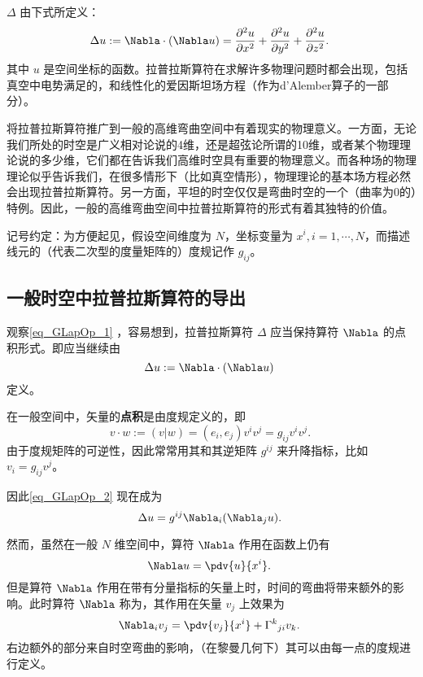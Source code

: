 
 $\Delta$ 由下式所定义：
\begin{equation}\label{eq_GLapOp_1}
\Delta u:=\Nabla\cdot (\Nabla u)=\frac{\partial^{2}{u}}{\partial{x}^{2}} + \frac{\partial^{2}{u}}{\partial{y}^{2}} + \frac{\partial^{2}{u}}{\partial{z}^{2}}.~
\end{equation}
其中 $u$ 是空间坐标的函数。拉普拉斯算符在求解许多物理问题时都会出现，包括真空中电势满足的，和线性化的爱因斯坦场方程（作为d'Alember算子的一部分）。

将拉普拉斯算符推广到一般的高维弯曲空间中有着现实的物理意义。一方面，无论我们所处的时空是广义相对论说的4维，还是超弦论所谓的10维，或者某个物理理论说的多少维，它们都在告诉我们高维时空具有重要的物理意义。而各种场的物理理论似乎告诉我们，在很多情形下（比如真空情形），物理理论的基本场方程必然会出现拉普拉斯算符。另一方面，平坦的时空仅仅是弯曲时空的一个（曲率为0的）特例。因此，一般的高维弯曲空间中拉普拉斯算符的形式有着其独特的价值。

记号约定：为方便起见，假设空间维度为 $N$，坐标变量为 $x^i,i=1,\cdots,N$，而描述线元的（代表二次型的度量矩阵的）度规记作 $g_{ij}$。

\subsection{一般时空中拉普拉斯算符的导出}
观察\autoref{eq_GLapOp_1} ，容易想到，拉普拉斯算符 $\Delta$ 应当保持算符 $\Nabla$ 的点积形式。即应当继续由
\begin{equation}\label{eq_GLapOp_2}
\Delta u:=\Nabla\cdot (\Nabla u)~
\end{equation}
定义。

在一般空间中，矢量的\textbf{点积}是由度规定义的，即
\begin{equation}
v\cdot w:=(v|w)=(e_i,e_j)v^iv^j=g_{ij}v^iv^j.~
\end{equation}
由于度规矩阵的可逆性，因此常常用其和其逆矩阵 $g^{ij}$ 来升降指标，比如 $v_i=g_{ij}v^j$。

因此\autoref{eq_GLapOp_2} 现在成为
\begin{equation}
\Delta u=g^{ij}\Nabla_i(\Nabla_j u).~
\end{equation}

然而，虽然在一般 $N$ 维空间中，算符 $\Nabla$ 作用在函数上仍有
\begin{equation}
\Nabla u=\pdv{u}{x^i}.~
\end{equation}
但是算符 $\Nabla$ 作用在带有分量指标的矢量上时，时间的弯曲将带来额外的影响。此时算符 $\Nabla$ 称为，其作用在矢量 $v_j$ 上效果为
\begin{equation}
\Nabla_i v_j= \pdv{v_j}{x^i}+{\Gamma^{k}}_{ji}v_k.~
\end{equation}
右边额外的部分来自时空弯曲的影响，（在黎曼几何下）其可以由每一点的度规进行定义。

